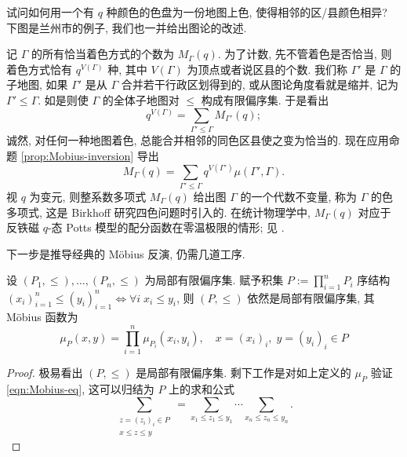\begin{example}[色多项式]
	试问如何用一个有 $q$ 种颜色的色盘为一份地图上色, 使得相邻的区/县颜色相异? 下图是兰州市的例子, 我们也一并给出图论的改述.
	\begin{center}\end{center}

	记 $\Gamma$ 的所有恰当着色方式的个数为 $M_\Gamma(q)$. 为了计数, 先不管着色是否恰当, 则着色方式恰有 $q^{V(\Gamma)}$ 种, 其中 $V(\Gamma)$ 为顶点或者说区县的个数. 我们称 $\Gamma'$ 是 $\Gamma$ 的子地图, 如果 $\Gamma'$ 是从 $\Gamma$ 合并若干行政区划得到的, 或从图论角度看就是缩并, 记为 $\Gamma' \leq \Gamma$. 如是则使 $\Gamma$ 的全体子地图对 $\leq$ 构成有限偏序集. 于是看出
	\[ q^{V(\Gamma)} = \sum_{\Gamma' \leq \Gamma} M_{\Gamma'}(q); \]
	诚然, 对任何一种地图着色, 总能合并相邻的同色区县使之变为恰当的. 现在应用命题 \ref{prop:Mobius-inversion} 导出
	\[ M_\Gamma(q) = \sum_{\Gamma' \leq \Gamma} q^{V(\Gamma')} \mu(\Gamma', \Gamma).  \]
	视 $q$ 为变元, 则整系数多项式 $M_\Gamma(q)$ 给出图 $\Gamma$ 的一个代数不变量, 称为 $\Gamma$ 的色多项式, 这是 Birkhoff 研究四色问题时引入的. 在统计物理学中, $M_\Gamma(q)$ 对应于反铁磁 $q$-态 Potts 模型的配分函数在零温极限的情形; 见 \cite{Sok05}.
\end{example}

下一步是推导经典的 Möbius 反演, 仍需几道工序.
\begin{lemma}\label{prop:Mobius-prod}
	设 $(P_1, \leq), \ldots, (P_n, \leq)$ 为局部有限偏序集. 赋予积集 $P := \prod_{i=1}^n P_i$ 序结构 $(x_i)_{i=1}^n \leq (y_i)_{i=1}^n \iff \forall i\; x_i \leq y_i$, 则 $(P, \leq)$ 依然是局部有限偏序集, 其 Möbius 函数为
	\[ \mu_P\left( x, y \right) = \prod_{i=1}^n \mu_{P_i}(x_i, y_i), \quad x=(x_i)_i, \; y=(y_i)_i \in P \]
\end{lemma}
\begin{proof}
	极易看出 $(P, \leq)$ 是局部有限偏序集. 剩下工作是对如上定义的 $\mu_P$ 验证 \eqref{eqn:Mobius-eq}, 这可以归结为 $P$ 上的求和公式
	\begin{equation*}
		\sum_{\substack{z = (z_i)_i \in P \\ x \leq z \leq y}} = \sum_{x_1 \leq z_1 \leq y_1} \cdots \sum_{x_n \leq z_n \leq y_n}.
	\end{equation*}
\end{proof}

